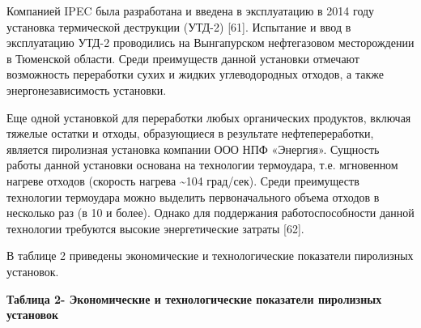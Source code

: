 Компанией IPEC была разработана и введена в экс­плуатацию в 2014 году
установка термической деструк­ции (УТД-2) {[}61{]}. Испытание и ввод в
эксплуатацию УТД-2 проводились на Вынгапурском нефтегазовом
месторож­дении в Тюменской области. Среди преимуществ данной установки
отмечают возможность переработки сухих и жидких углеводородных отходов,
а также энергонезави­симость установки.

Еще одной установкой для переработки любых орга­нических продуктов,
включая тяжелые остатки и отходы, образующиеся в результате
нефтепереработки, является пиролизная установка компании ООО НПФ
«Энергия». Сущность работы данной установки основана на тех­нологии
термоудара, т.е. мгновенном нагреве отходов (скорость нагрева
\textasciitilde104 град/сек). Среди преимуществ технологии термоудара
можно выделить первоначально­го объема отходов в несколько раз (в 10 и
более). Однако для поддержания работоспособности данной технологии
требуются высокие энергетические затраты {[}62{]}.

В таблице 2 приведены экономические и технологические показатели
пиролизных установок.

{\bfseries Таблица 2- Экономические и технологические показатели пиролизных
установок}

